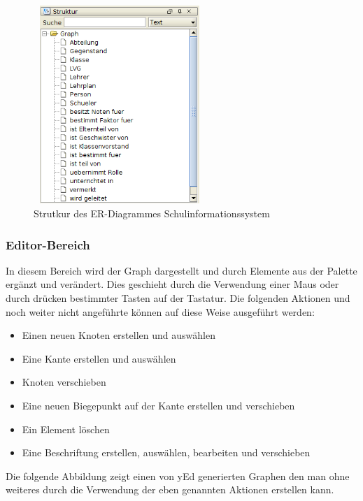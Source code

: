 \begin{figure}[H]
	\begin{center}
		\includegraphics[width=6.5cm,height=7.5cm]{images/yed_struktur.png}
		\caption{Strutkur des ER-Diagrammes Schulinformationssystem}
		\label{yEdStruktur}
	\end{center}
\end{figure}

\subsubsection{Editor-Bereich}
\prc

In diesem Bereich wird der Graph dargestellt und durch Elemente aus der Palette ergänzt und verändert. Dies geschieht durch die Verwendung einer Maus oder durch drücken bestimmter Tasten auf der Tastatur. Die folgenden Aktionen und noch weiter nicht angeführte können auf diese Weise ausgeführt werden:
\\

\begin{itemize}
    \item Einen neuen Knoten erstellen und auswählen
    \item Eine Kante erstellen und auswählen
    \item Knoten verschieben
    \item Eine neuen Biegepunkt auf der Kante erstellen und verschieben
    \item Ein Element löschen
    \item Eine Beschriftung erstellen, auswählen, bearbeiten und verschieben
    \\
\end{itemize}

\noindent
Die folgende Abbildung zeigt einen von yEd generierten Graphen den man ohne weiteres durch die Verwendung der eben genannten Aktionen erstellen kann.

